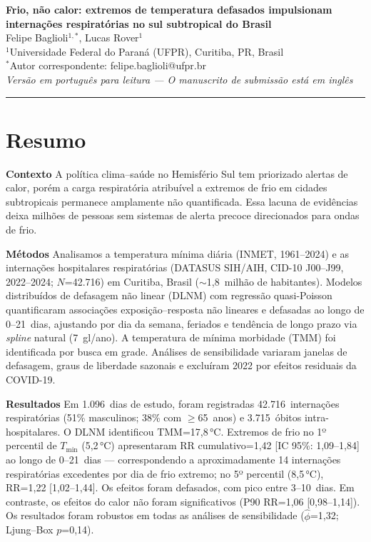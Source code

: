 \documentclass[12pt]{article}
\begin{document}
\begin{center}
{\LARGE\bfseries Frio, não calor: extremos de temperatura defasados
impulsionam internações respiratórias no sul subtropical do Brasil}\\[1.5em]
{\large Felipe Baglioli$^{1,*}$, Lucas Rover$^1$}\\[0.5em]
$^1$Universidade Federal do Paraná (UFPR), Curitiba, PR, Brasil\\
$^*$Autor correspondente: felipe.baglioli@ufpr.br\\[1em]
{\small\itshape Versão em português para leitura --- O manuscrito de
submissão está em inglês}
\end{center}

\bigskip
\hrule
\bigskip


\section*{Resumo}

\textbf{Contexto}\quad
A política clima--saúde no Hemisfério Sul tem priorizado alertas de
calor, porém a carga respiratória atribuível a extremos de frio em
cidades subtropicais permanece amplamente não quantificada. Essa
lacuna de evidências deixa milhões de pessoas sem sistemas de alerta
precoce direcionados para ondas de frio.

\textbf{Métodos}\quad
Analisamos a temperatura mínima diária (INMET, 1961--2024) e as
internações hospitalares respiratórias (DATASUS SIH/AIH, CID-10
J00--J99, 2022--2024; $N$=42.716) em Curitiba, Brasil
($\sim$1,8~milhão de habitantes). Modelos distribuídos de defasagem
não linear (DLNM) com regressão quasi-Poisson quantificaram
associações exposição--resposta não lineares e defasadas ao longo de
0--21~dias, ajustando por dia da semana, feriados e tendência de longo
prazo via \textit{spline} natural (7~gl/ano). A temperatura de mínima
morbidade (TMM) foi identificada por busca em grade. Análises de
sensibilidade variaram janelas de defasagem, graus de liberdade
sazonais e excluíram 2022 por efeitos residuais da COVID-19.

\textbf{Resultados}\quad
Em 1.096~dias de estudo, foram registradas 42.716~internações
respiratórias (51\% masculinos; 38\% com $\geq$65~anos) e
3.715~óbitos intra-hospitalares. O DLNM identificou TMM=17,8\,°C.
Extremos de frio no 1º percentil de $T_\mathrm{min}$ (5,2\,°C)
apresentaram RR cumulativo=1,42 [IC 95\%: 1,09--1,84] ao longo de
0--21~dias --- correspondendo a aproximadamente 14 internações
respiratórias excedentes por dia de frio extremo; no 5º percentil
(8,5\,°C), RR=1,22 [1,02--1,44]. Os efeitos foram defasados, com
pico entre 3--10~dias. Em contraste, os efeitos do calor não foram
significativos (P90 RR=1,06 [0,98--1,14]). Os resultados foram
robustos em todas as análises de sensibilidade
($\hat{\phi}$=1,32; Ljung--Box $p$=0,14).
\end{document}

